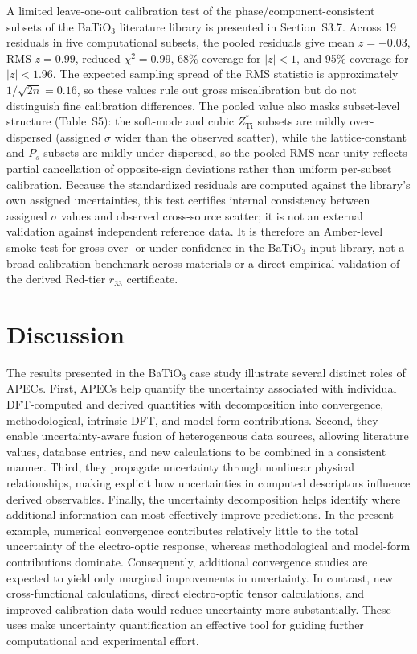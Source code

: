 \documentclass[twocolumn,superscriptaddress,amsmath,amssymb,longbibliography]{revtex4-2}
\begin{document}
A limited leave-one-out calibration test of the phase/component-consistent
subsets of the BaTiO$_3$ literature library is presented in  Section~S3.7. Across 19 residuals in five computational subsets, the
pooled residuals give mean $z=-0.03$, RMS $z=0.99$, reduced $\chi^2=0.99$,
68\% coverage for $|z|<1$, and 95\% coverage for $|z|<1.96$. The expected
sampling spread of the RMS statistic is approximately $1/\sqrt{2n}=0.16$, so
these values rule out gross miscalibration but do not distinguish fine
calibration differences. The pooled value also masks subset-level structure
(Table~S5): the soft-mode and cubic $Z^*_{\mathrm{Ti}}$
subsets are mildly over-dispersed (assigned $\sigma$ wider than the observed
scatter), while the lattice-constant and $P_s$ subsets are mildly
under-dispersed, so the pooled RMS near unity reflects partial cancellation of
opposite-sign deviations rather than uniform per-subset calibration. Because the
standardized residuals are computed against the library's own assigned
uncertainties, this test certifies internal consistency between assigned
$\sigma$ values and observed cross-source scatter; it is not an external
validation against independent reference data. It is therefore an Amber-level
smoke test for gross over- or under-confidence in the BaTiO$_3$ input library,
not a broad calibration benchmark across materials or a direct empirical
validation of the derived Red-tier $r_{33}$ certificate.



\section{Discussion}
\label{sec:discussion}

The results presented in the  BaTiO$_3$ case study illustrate several distinct roles of APECs. First, APECs help quantify the uncertainty associated with individual DFT-computed and derived quantities with decomposition into convergence, methodological, intrinsic DFT, and model-form contributions.
Second, they enable uncertainty-aware fusion of heterogeneous data sources, allowing literature values, database entries, and new calculations to be combined in a consistent manner.
Third, they propagate uncertainty through nonlinear physical relationships, making explicit how uncertainties in computed descriptors influence derived observables.
Finally, the uncertainty decomposition helps identify where additional information can most effectively improve predictions. In the present example, numerical convergence contributes relatively little to the total uncertainty of the electro-optic response, whereas methodological and model-form contributions dominate. Consequently, additional convergence studies are expected to yield only marginal improvements in uncertainty. In contrast, new cross-functional calculations, direct electro-optic tensor calculations, and improved calibration data would reduce uncertainty more substantially. These uses make  uncertainty quantification  an effective tool for guiding further computational and experimental effort.
\end{document}

